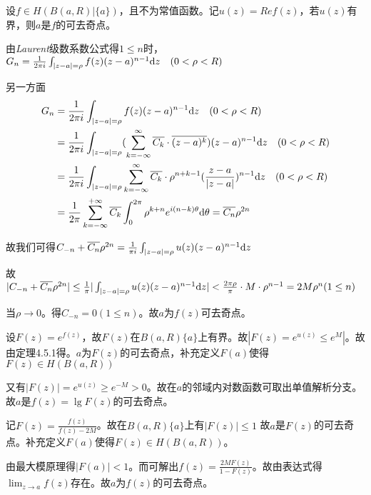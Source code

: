 \begin{eg}
	\color{blue}设$f\in H(B(a,R )|\{ a\})$，且不为常值函数。记$u(z)=Ref(z)$，若$u(z)$有界，则$a$是$f$的可去奇点。
	\color{black}
	\begin{jie}{1}
		
		
		由\emph{Laurent}级数系数公式得$1\le n$时，$G_{n}=\frac{1}{2\pi i}\int_{|z-a|=\rho}f(z)(z-a)^{n-1}\mathrm{d}z \quad(0<\rho<R)$
		
		另一方面
		\begin{align*}
		G_{n}&=\frac{1}{2\pi i}\int_{|z-a|=\rho}f(z)(z-a)^{n-1}\mathrm{d}z \quad(0<\rho<R)\\
		&=\frac{1}{2\pi i}\int_{|z-a|=\rho}(\sum_{k=-\infty}^{\infty }\overline{C_{k}}\cdot\overline{(z-a)^{k}})(z-a)^{n-1}\mathrm{d}z \quad(0<\rho<R)\\
		&=\frac{1}{2\pi i}\int_{|z-a|=\rho}\sum_{k=-\infty}^{\infty }\overline{C_{k}} \cdot \rho^{n+k-1}(\frac{z-a}{|z-a|})^{n-1}\mathrm{d}z \quad(0<\rho<R)\\
		&=\frac{1}{2\pi}\sum_{k=-\infty}^{+\infty}\overline{C_{k}}\int_{0}^{2\pi}\rho^{k+n}e^{i(n-k)\theta}\mathrm{d}\theta=\overline{C_{n}}\rho^{2n}
		\end{align*}
		
		故我们可得$C_{-n}+\overline{C_{n}}\rho^{2n}=\frac{1}{\pi i}\int_{|z-a|=\rho}u(z)(z-a)^{n-1}\mathrm{d}z$
		
		故$|C_{-n}+\overline{C_{n}}\rho^{2n}|\le \frac{1}{\pi}|\int_{|z-a|=\rho}u(z)(z-a)^{n-1}\mathrm{d}z|<\frac{2\pi \rho}{\pi}\cdot M \cdot \rho^{n-1}=2M\rho^{n}(1\le n)$
		
		当$\rho\rightarrow 0$。得$C_{-n}=0(1\le n)$。故$a$为$f(z)$可去奇点。
	\end{jie}
	\begin{jie}{2}
		
		
		设$F(z)=e^{f(z)}$，故$F(z)$在$B(a,R)\{ a\}$上有界。故$|F(z)=e^{u(z)}\le e^{M}|$。故由定理4.5.1得。$a$为$F(z)$的可去奇点，补充定义$F(a)$使得$F(z)\in H(B(a,R))$
		
		又有$|F(z)|=e^{u(z)}\ge e^{-M}>0$。故在$a$的邻域内对数函数可取出单值解析分支。故$a$是$f(z)=\lg F(z)$的可去奇点。
	\end{jie}
	\begin{jie}{3}
			
		记$F(z)=\frac{f(z)}{f(z)-2M}$。故在$B(a,R)\{a\}$上有$|F(z)|\le 1$
		故$a$是$F(z)$的可去奇点。补充定义$F(a)$使得$F(z)\in H(B(a,R))$。
		
		由最大模原理得$|F(a)|<1$。而可解出$f(z)=\frac{2MF(z)}{1-F(z)}$。故由表达式得$\displaystyle\lim_{z\rightarrow a}f(z)$存在。故$a$为$f(z)$的可去奇点。
	\end{jie}
\end{eg}
